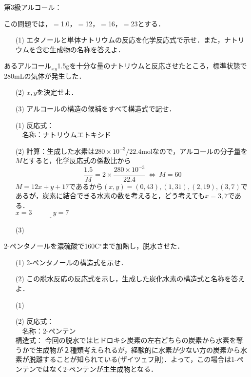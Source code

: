 \documentclass[a4paper,12pt]{ltjsreport}
\begin{document}
    \noindent 第3級アルコール：\newpage
    \begin{que}
        この問題では，$=$1.0，$=$12，$=$16，$=$23とする．
    \begin{itemize}
        \item [(1)]エタノールと単体ナトリウムの反応を化学反応式で示せ．また，ナトリウムを含む生成物の名称を答えよ．
    \end{itemize}
            あるアルコール$_{x}$$_{y}$1.5gを十分な量のナトリウムと反応させたところ，標準状態で280mLの気体が発生した．
            \begin{itemize}
                \item [(2)]$x,y$を決定せよ．
                \item [(3)]アルコールの構造の候補をすべて構造式で記せ．
            \end{itemize}
    \end{que}
    \ans
    \begin{itemize}
        \item [(1)]反応式：\\[15pt]
        　名称：ナトリウムエトキシド\\[10pt]
        \item[(2)]計算：生成した水素は$280\times 10^{-3}/22.4$molなので，アルコールの分子量を$M$とすると，化学反応式の係数比から
        \[\frac{1.5}{M}=2\times\frac{280\times 10^{-3}}{22.4}~\Longleftrightarrow~M=60\]
        $M=12x+y+17$であるから$(x,y)=(0,43),(1,31),(2,19),(3,7)$であるが，炭素に結合できる水素の数を考えると，どう考えても$x=3,7$である．\\[10pt]$　　　　　　　　　　　　　　　　　　　　　　　　\underline{x=3~~~~~~~~~~~~~~y=7~~~~~~~~~~~}$\\[10pt]
        \item[(3)] 　　　　　　
    \end{itemize}
    \newpage
    \begin{que}
      2-ペンタノールを濃硫酸で160C$^\circ$まで加熱し，脱水させた．
      \begin{itemize}
        \item [(1)]2-ペンタノールの構造式を示せ．
        \item [(2)]この脱水反応の反応式を示し，生成した炭化水素の構造式と名称を答えよ．
      \end{itemize}
    \end{que}
    \ans
    \begin{itemize}
        \item [(1)]　\\[70pt]
        \item [(2)]反応式：\\[30pt]
        　名称：2-ペンテン\\[30pt]
        構造式：
        今回の脱水ではヒドロキシ炭素の左右どちらの炭素から水素を奪うかで生成物が２種類考えられるが，経験的に水素が少ない方の炭素から水素が脱離することが知られている(ザイツェフ則)．よって，この場合は1-ペンテンではなく2-ペンテンが主生成物となる．
    \end{itemize}
\end{document}
